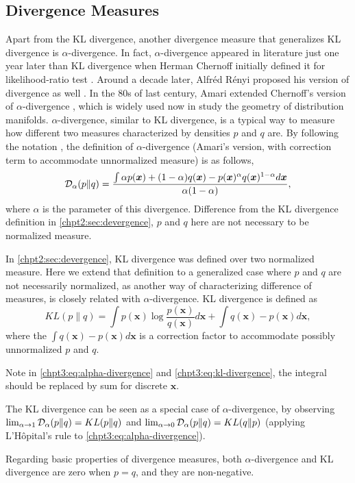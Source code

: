 \subsection{Divergence Measures}
Apart from the KL divergence, another divergence measure that generalizes KL divergence is $\alpha$-divergence. In fact, $\alpha$-divergence appeared in literature just one year later than KL divergence when Herman Chernoff initially defined it for likelihood-ratio test \cite{Chernoff1952measure}. Around a decade later, Alfr\'ed R\'enyi proposed his version of divergence as well \cite{renyi1961entropy}. In the 80s of last century, Amari extended Chernoff's version of $\alpha$-divergence \cite{amari1982differential}, which is widely used now in study the geometry of distribution manifolds. 
$\alpha$-divergence, similar to KL divergence, is a typical way to measure how different two measures characterized by densities $p$ and $q$ are. By following the notation \cite{Zhu95informationgeometric}, the definition of $\alpha$-divergence (Amari's version, with correction term to accommodate unnormalized measure) is as follows,
\begin{equation}\label{chpt3:eq:alpha-divergence}
  \mathcal{D}_{\alpha}(p \| q ) = \frac{\int \alpha p(\bm{x}) + (1-\alpha) q (\bm{x}) - p(\bm{x})^{\alpha} q(\bm{x})^{1-\alpha} d\bm{x}}{\alpha(1-\alpha)},
\end{equation}
where $\alpha$ is the parameter of this divergence. Difference from the KL divergence definition in \autoref{chpt2:sec:devergence}, $p$ and $q$ here are not necessary to be normalized measure.

In \autoref{chpt2:sec:devergence}, KL divergence was defined over two normalized measure. Here we extend that definition to a generalized case where $p$ and $q$ are not necessarily normalized, as another way of characterizing difference of measures, is closely related with $\alpha$-divergence. KL divergence is defined as
\begin{equation}\label{chpt3:eq:kl-divergence}
  KL(p \| q) = \int p(\bm{x}) \log{\frac{p(\bm{x})}{q(\bm{x})}} d \bm{x}+ \int q(\bm{x}) - p(\bm{x}) d\bm{x},
\end{equation}
where the $\int q(\bm{x}) - p(\bm{x}) d\bm{x}$ is a correction factor to accommodate possibly unnormalized $p$ and $q$.
\begin{remark}
  Note in \eqref{chpt3:eq:alpha-divergence} and \eqref{chpt3:eq:kl-divergence}, the integral should be replaced by sum for discrete $\bm{x}$.
\end{remark}
\begin{remark}
  The KL divergence can be seen as a special case of $\alpha$-divergence, by observing $\lim_{\alpha \rightarrow 1}\mathcal{D}_{\alpha}(p \| q ) = KL(p\|q)$ and $\lim_{\alpha \rightarrow 0}\mathcal{D}_{\alpha}(p \| q ) = KL(q\|p)$ (applying L'H\^opital's rule to \eqref{chpt3:eq:alpha-divergence}).

  Regarding basic properties of divergence measures, both $\alpha$-divergence and KL divergence are zero when $p=q$, and they are non-negative. 
\end{remark}

